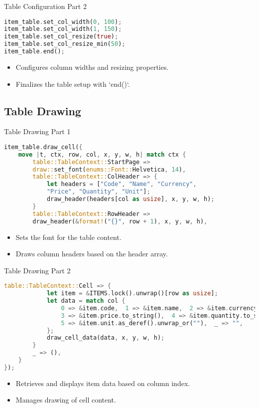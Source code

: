 \documentclass[aspectratio=169, table]{beamer}
\begin{document}
\begin{frame}[fragile]{Table Configuration Part 2}
\begin{lstlisting}[language=Rust]
item_table.set_col_width(0, 100);
item_table.set_col_width(1, 150);
item_table.set_col_resize(true);
item_table.set_col_resize_min(50);
item_table.end();
\end{lstlisting}

\begin{itemize}
\item Configures column widths and resizing properties.
\item Finalizes the table setup with `end()`.
\end{itemize}
\end{frame}

\subsection{Table Drawing}
\begin{frame}[fragile]{Table Drawing Part 1}
\begin{lstlisting}[language=Rust]
item_table.draw_cell({
	move |t, ctx, row, col, x, y, w, h| match ctx {
		table::TableContext::StartPage => 
		draw::set_font(enums::Font::Helvetica, 14),
		table::TableContext::ColHeader => {
			let headers = ["Code", "Name", "Currency", 
			"Price", "Quantity", "Unit"];
			draw_header(headers[col as usize], x, y, w, h);
		}
		table::TableContext::RowHeader => 
		draw_header(&format!("{}", row + 1), x, y, w, h),
	\end{lstlisting}
	
	\begin{itemize}
		\item Sets the font for the table content.
		\item Draws column headers based on the header array.
	\end{itemize}
\end{frame}

\begin{frame}[fragile]{Table Drawing Part 2}
	\vspace{15pt}
	\begin{lstlisting}[language=Rust]
		table::TableContext::Cell => {
			let item = &ITEMS.lock().unwrap()[row as usize];
			let data = match col {
				0 => &item.code,  1 => &item.name,  2 => &item.currency, 
				3 => &item.price.to_string(),  4 => &item.quantity.to_string(),
				5 => &item.unit.as_deref().unwrap_or(""),  _ => "",
			};
			draw_cell_data(data, x, y, w, h);
		}
		_ => (),
	}
});
\end{lstlisting}

\begin{itemize}
\item Retrieves and displays item data based on column index.
\item Manages drawing of cell content.
\end{itemize}
\end{frame}
\end{document}
